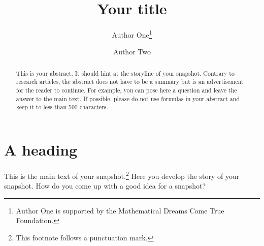 \documentclass{snapshotmfo}
\author{Author One\thanks{Author One is supported by the Mathematical Dreams Come True Foundation.} \and Author Two}
\title{Your title}
\begin{document}

\begin{abstract}
This is your abstract. It should hint at the storyline of your snapshot. Contrary to research articles, the abstract does not have to be a summary but is an advertisement for the reader to continue. For example, you can pose here a question and leave the answer to the main text. If possible, please do not use formulas in your abstract and keep it to less than 500 characters.
\end{abstract}

\section{A heading}

This is the main text of your snapshot.\footnote{This footnote follows a punctuation mark.} Here you develop the story of your snapshot.
How do you come up with a good idea for a snapshot?
\end{document}

